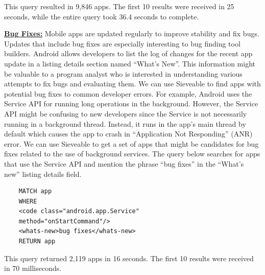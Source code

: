 This query resulted in 9,846 apps. The first 10 results were received in 25 seconds, while the entire query took 36.4 seconds to complete.

\underline{\textbf{{Bug Fixes:}}}
Mobile apps are updated regularly to improve stability and fix bugs.
Updates that include bug fixes are especially interesting to bug finding tool builders.
Android allows developers to list the log of changes for the recent app update in a listing details section named ``What's New''.
This information might be valuable to a program analyst who is interested in understanding various attempts to fix bugs and evaluating them.
We can use Sieveable to find apps with potential bug fixes to common developer errors.
For example, Android uses the Service API for running long operations in the background.
However, the Service API might be confusing to new developers since the Service is not necessarily running in a background thread.
Instead, it runs in the app's main thread by default which causes the app to crash in ``Application Not Responding'' (ANR) error.
We can use Sieveable to get a set of apps that might be candidates for bug fixes related to the use of background services. The query below searches for apps that use the Service API and mention the phrase ``bug fixes'' in the ``What's new'' listing details field.

\begin{verbatim}
	MATCH app
	WHERE
	<code class="android.app.Service"
	method="onStartCommand"/>
	<whats-new>bug fixes</whats-new> 
	RETURN app
\end{verbatim}

This query returned 2,119 apps in 16 seconds. The first 10 results were received in 70 milliseconds.


